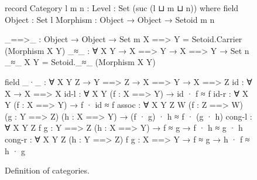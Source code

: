 \begin{figure}
\begin{code}
record Category {l m n : Level} : Set (suc (l ⊔ m ⊔ n)) where
  field
    Object    :  Set l
    Morphism  :  Object → Object → Setoid {m} {n}

  _==>_ : Object → Object → Set m
  X ==> Y = Setoid.Carrier (Morphism X Y)
  _≈_ : ∀ {X Y} → X ==> Y → X ==> Y → Set n
  _≈_ {X} {Y} = Setoid._≈_ (Morphism X Y)

  field
    _·_  :   ∀ {X Y Z} → Y ==> Z → X ==> Y → X ==> Z
    id   :   ∀ {X} → X ==> X
    id-l    :  ∀ {X Y} (f : X ==> Y) → id · f ≈ f
    id-r    :  ∀ {X Y} (f : X ==> Y) → f · id ≈ f
    assoc   :  ∀ {X Y Z W}
               (f : Z ==> W) (g : Y ==> Z) (h : X ==> Y) →
               (f · g) · h ≈ f · (g · h)
    cong-l  :  ∀ {X Y Z} {f g : Y ==> Z} (h : X ==> Y) →
               f ≈ g → f · h ≈ g · h
    cong-r  :  ∀ {X Y Z} (h : Y ==> Z) {f g : X ==> Y} →
               f ≈ g → h · f ≈ h · g
\end{code}
\caption{Definition of categories.}
\label{fig:category}
\end{figure}

